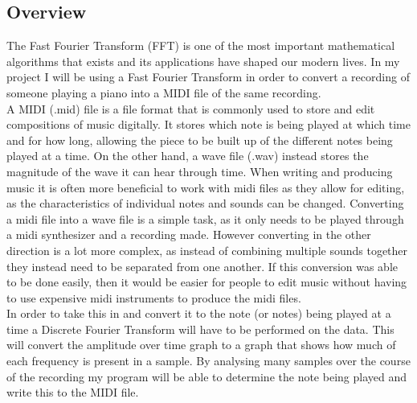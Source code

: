 \documentclass[12pt]{report}
\begin{document}
\subsection*{Overview}
The Fast Fourier Transform (FFT) is one of the most important mathematical algorithms that exists and its applications have shaped our modern lives. In my project I will be using a Fast Fourier Transform in order to convert a recording of someone playing a piano into a MIDI file of the same recording. \\
A MIDI (.mid) file is a file format that is commonly used to store and edit compositions of music digitally. It stores which note is being played at which time and for how long, allowing the piece to be built up of the different notes being played at a time. On the other hand, a wave file (.wav) instead stores the magnitude of the wave it can hear through time. When writing and producing music it is often more beneficial to work with midi files as they allow for editing, as the characteristics of individual notes and sounds can be changed. Converting a midi file into a wave file is a simple task, as it only needs to be played through a midi synthesizer and a recording made. However converting in the other direction is a lot more complex, as instead of combining multiple sounds together they instead need to be separated from one another. If this conversion was able to be done easily, then it would be easier for people to edit music without having to use expensive midi instruments to produce the midi files.\\
In order to take this in and convert it to the note (or notes) being played at a time a Discrete Fourier Transform will have to be performed on the data. This will convert the amplitude over time graph to a graph that shows how much of each frequency is present in a sample. By analysing many samples over the course of the recording my program will be able to determine the note being played and write this to the MIDI file.
\end{document}
